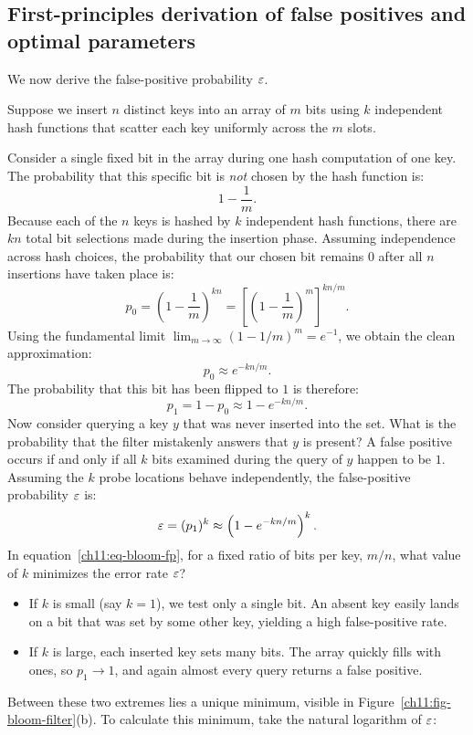 \subsection{First-principles derivation of false positives and optimal parameters}

We now derive the false-positive probability $\varepsilon$.

Suppose we insert $n$ distinct keys into an array of $m$ bits using $k$ independent hash functions that scatter each key uniformly across the $m$ slots.

Consider a single fixed bit in the array during one hash computation of one key. The probability that this specific bit is \emph{not} chosen by the hash function is:
\[
  1 - \frac{1}{m}.
\]
Because each of the $n$ keys is hashed by $k$ independent hash functions, there are $kn$ total bit selections made during the insertion phase. Assuming independence across hash choices, the probability that our chosen bit remains $0$ after all $n$ insertions have taken place is:
\[
  p_0 = \left(1 - \frac{1}{m}\right)^{kn} = \left[\left(1 - \frac{1}{m}\right)^m\right]^{kn/m}.
\]
Using the fundamental limit $\lim_{m \to \infty} (1 - 1/m)^m = e^{-1}$, we obtain the clean approximation:
\[
  p_0 \approx e^{-kn/m}.
\]
The probability that this bit has been flipped to $1$ is therefore:
\[
  p_1 = 1 - p_0 \approx 1 - e^{-kn/m}.
\]
Now consider querying a key $y$ that was never inserted into the set. What is the probability that the filter mistakenly answers that $y$ is present? A false positive occurs if and only if all $k$ bits examined during the query of $y$ happen to be $1$. Assuming the $k$ probe locations behave independently, the false-positive probability $\varepsilon$ is:
\begin{equation}
  \label{ch11:eq-bloom-fp}
  \varepsilon = (p_1)^k \approx \left(1 - e^{-kn/m}\right)^k.
\end{equation}
In equation~\eqref{ch11:eq-bloom-fp}, for a fixed ratio of bits per key, $m/n$, what value of $k$ minimizes the error rate $\varepsilon$?
\begin{itemize}
  \item If $k$ is small (say $k=1$), we test only a single bit. An absent key easily lands on a bit that was set by some other key, yielding a high false-positive rate.
  \item If $k$ is large, each inserted key sets many bits. The array quickly fills with ones, so $p_1 \to 1$, and again almost every query returns a false positive.
\end{itemize}
Between these two extremes lies a unique minimum, visible in Figure~\ref{ch11:fig-bloom-filter}(b). To calculate this minimum, take the natural logarithm of $\varepsilon$:
